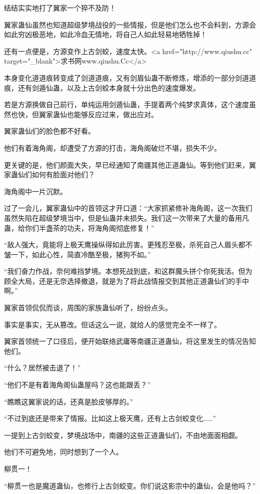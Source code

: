 \begin{this_body}
结结实实地打了翼家一个猝不及防！

翼家蛊仙虽然也知道超级梦境战役的一些情报，但是他们怎么也不会料到，方源会如此穷凶极恶地，如此冷血无情地，将自己人如此轻易地牺牲掉！

还有一点便是，方源变作上古剑蛟，速度太快。<a href="http://www.qiushu.cc" target="\_blank">求书网www.qiushu.Cc</a>

本身变化道道痕转变成了剑道道痕，又有剑眉仙蛊不断修炼，增添的一部分剑道道痕，还有剑遁仙蛊，以及上古剑蛟本身就十分出色的速度爆发。

若是方源换做自己前行，单纯运用剑遁仙蛊，手提着两个纯梦求真体，这个速度虽然也快，但翼家蛊仙也能够反应过来，做出应对。

翼家蛊仙们的脸色都不好看。

他们有着海角阁，却遭受了方源的打击，海角阁破烂不堪，损失不少。

更关键的是，他们颜面大失，早已经通知了南疆其他正道蛊仙。等到他们赶来，翼家蛊仙们如何有脸面对他们？

海角阁中一片沉默。

过了一会儿，翼家蛊仙中的首领这才开口道：“大家抓紧修补海角阁，这一次我们虽然失陷在超级梦境当中，但是仙蛊并未损失。我们这一次带来了大量的备用凡蛊，给你们半盏茶的功夫，将海角阁彻底修复！”

“敌人强大，竟能将上极天鹰操纵得如此厉害。更残忍至极，杀死自己人眉头都不皱一下，如此心性，简直冷酷至极，猪狗不如。”

“我们奋力作战，奈何难挡梦境。本想死战到底，和这群魔头拼个你死我活。但为顾全大局，还是无奈选择撤退，就是为了将此战情报交到其他正道蛊仙们的手中啊。”

翼家首领侃侃而谈，周围的家族蛊仙听了，纷纷点头。

事实是事实，无从篡改。但话这么一说，就给人的感觉完全不一样了。

翼家首领统一了口径后，便开始联络武庸等南疆正道蛊仙，将这里发生的情况告知他们。

“什么？居然被击退了！”

“他们不是有着海角阁仙蛊屋吗？这也能跟丢？”

“瞧瞧这翼家说的话，还真是脸皮够厚的。”

“不过到底还是带来了情报。比如这上极天鹰，还有上古剑蛟变化……”

一提到上古剑蛟变，梦境战场中，南疆的这些正道蛊仙们，不由地面面相觑。

他们不可避免地，同时想到了一个人。

柳贯一！

“柳贯一也是魔道蛊仙，也修行上古剑蛟变。你们说这影宗中的蛊仙，会是他吗？”


\end{this_body}
